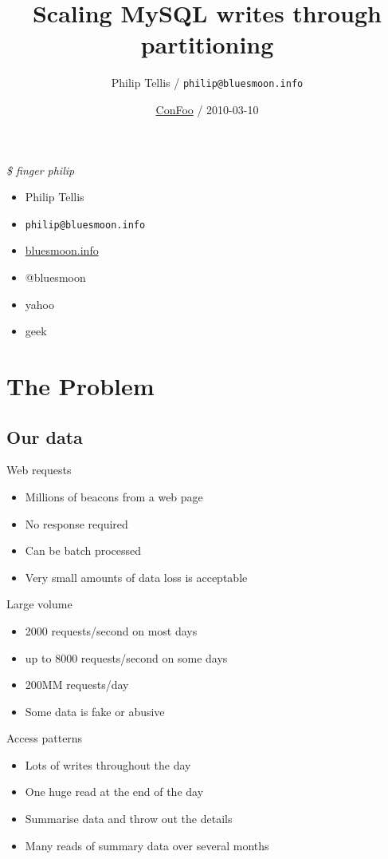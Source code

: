 \documentclass{beamer}
\author{Philip Tellis / \texttt{philip@bluesmoon.info}}
\title{Scaling MySQL writes through partitioning}
\date{\href{http://confoo.ca/}{ConFoo} / 2010-03-10}
\begin{document}
\begin{frame}
  \titlepage
\end{frame}


\begin{frame}{\textit{\$ finger philip}}
  \begin{itemize}
  \item Philip Tellis
  \item \small{\texttt{philip@bluesmoon.info}}
  \item \href{http://bluesmoon.info/}{bluesmoon.info}
  \item @bluesmoon
  \item yahoo
  \item geek
  \end{itemize}
\end{frame}


\section{The Problem}
\subsection{Our data}
\begin{frame}{Web requests}
  \begin{itemize}
  \item Millions of beacons from a web page
  \item No response required
  \item Can be batch processed
  \item Very small amounts of data loss is acceptable
  \end{itemize}
\end{frame}

\begin{frame}{Large volume}
  \begin{itemize}
  \item 2000 requests/second on most days
  \item up to 8000 requests/second on some days
  \item 200MM requests/day
  \item Some data is fake or abusive
  \end{itemize}
\end{frame}

\begin{frame}{Access patterns}
  \begin{itemize}
  \item Lots of writes throughout the day
  \item One huge read at the end of the day
  \item Summarise data and throw out the details
  \item Many reads of summary data over several months
  \end{itemize}
\end{frame}
\end{document}
